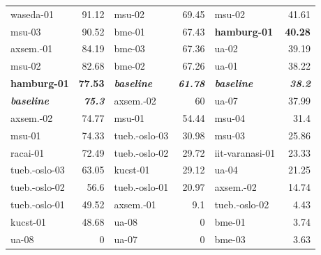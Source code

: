 \documentclass[a4paper]{article}
\begin{document}
\begin{table}
\begin{tabular}{lr|lr|lr}
waseda-01                  & 91.12                  & msu-02                     & 69.45                   & msu-02                     & 41.61                  \\
msu-03                     & 90.52                  & bme-01                     & 67.43                   & \textbf{hamburg-01}        & \textbf{40.28}         \\
axsem.-01             & 84.19                  & bme-03                     & 67.36                   & ua-02                      & 39.19                  \\
msu-02                     & 82.68                  & bme-02                     & 67.26                   & ua-01                      & 38.22                  \\
\textbf{hamburg-01}        & \textbf{77.53}         & \textit{\textbf{baseline}} & \textit{\textbf{61.78}} & \textit{\textbf{baseline}} & \textit{\textbf{38.2}} \\
\textit{\textbf{baseline}} & \textit{\textbf{75.3}} & axsem.-02             & 60                      & ua-07                      & 37.99                  \\
axsem.-02             & 74.77                  & msu-01                     & 54.44                   & msu-04                     & 31.4                   \\
msu-01                     & 74.33                  & tueb.-oslo-03          & 30.98                   & msu-03                     & 25.86                  \\
racai-01                   & 72.49                  & tueb.-oslo-02          & 29.72                   & iit-varanasi-01            & 23.33                  \\
tueb.-oslo-03          & 63.05                  & kucst-01                   & 29.12                   & ua-04                      & 21.25                  \\
tueb.-oslo-02          & 56.6                   & tueb.-oslo-01          & 20.97                   & axsem.-02             & 14.74                  \\
tueb.-oslo-01          & 49.52                  & axsem.-01             & 9.1                     & tueb.-oslo-02          & 4.43                   \\
kucst-01                   & 48.68                  & ua-08                      & 0                       & bme-01                     & 3.74                   \\
ua-08                      & 0                      & ua-07                      & 0                       & bme-03                     & 3.63                   \\

\end{tabular}
\end{table}
\end{document}
